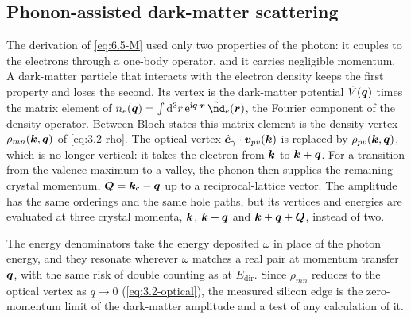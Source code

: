 \subsection{Phonon-assisted dark-matter scattering}

The derivation of \cref{eq:6.5-M} used only two properties of the photon: it couples to the electrons through a one-body operator, and it carries negligible momentum. A dark-matter particle that interacts with the electron density keeps the first property and loses the second. Its vertex is the dark-matter potential $\tilde V(\bm{q})$ times the matrix element of $n_e(\vect{q}) = \int\dd^3r\,\ee^{\ii\vect{q}\cdot\vect{r}}\,\op{\nd}_e(\vect{r})$, the Fourier component of the density operator. Between Bloch states this matrix element is the density vertex $\rho_{mn}(\bm{k},\bm{q})$ of \cref{eq:3.2-rho}. The optical vertex $\hat{\bm{e}}_\gamma\cdot\bm{v}_{pv}(\bm{k})$ is replaced by $\rho_{pv}(\bm{k},\bm{q})$, which is no longer vertical: it takes the electron from $\bm{k}$ to $\bm{k} + \bm{q}$. For a transition from the valence maximum to a valley, the phonon then supplies the remaining crystal momentum, $\bm{Q} = \bm{k}_{\mathrm{c}} - \bm{q}$ up to a reciprocal-lattice vector. The amplitude has the same orderings and the same hole paths, but its vertices and energies are evaluated at three crystal momenta, $\bm{k}$, $\bm{k} + \bm{q}$ and $\bm{k} + \bm{q} + \bm{Q}$, instead of two.

The energy denominators take the energy deposited $\omega$ in place of the photon energy, and they resonate wherever $\omega$ matches a real pair at momentum transfer $\bm{q}$, with the same risk of double counting as at $E_{\mathrm{dir}}$. Since $\rho_{mn}$ reduces to the optical vertex as $q \to 0$ (\cref{eq:3.2-optical}), the measured silicon edge is the zero-momentum limit of the dark-matter amplitude and a test of any calculation of it.

